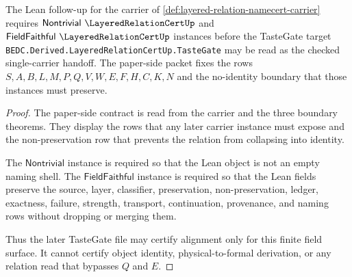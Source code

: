 \begin{theorem}
\label{thm:layered-relation-namecert-tastegate-contract}
The Lean follow-up for the carrier of \autoref{def:layered-relation-namecert-carrier} requires $\mathsf{Nontrivial}\ \LayeredRelationCertUp$ and $\mathsf{FieldFaithful}\ \LayeredRelationCertUp$ instances before the TasteGate target \texttt{BEDC.Derived.LayeredRelationCertUp.TasteGate} may be read as the checked single-carrier handoff. The paper-side packet fixes the rows $S,A,B,L,M,P,Q,V,W,E,F,H,C,K,N$ and the no-identity boundary that those instances must preserve.
\end{theorem}
\begin{proof}
The paper-side contract is read from the carrier and the three boundary theorems. They display the rows that any later carrier instance must expose and the non-preservation row that prevents the relation from collapsing into identity.

The $\mathsf{Nontrivial}$ instance is required so that the Lean object is not an empty naming shell. The $\mathsf{FieldFaithful}$ instance is required so that the Lean fields preserve the source, layer, classifier, preservation, non-preservation, ledger, exactness, failure, strength, transport, continuation, provenance, and naming rows without dropping or merging them.

Thus the later TasteGate file may certify alignment only for this finite field surface. It cannot certify object identity, physical-to-formal derivation, or any relation read that bypasses $Q$ and $E$.
\end{proof}

